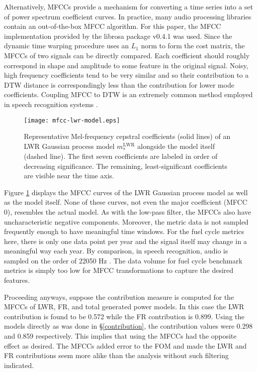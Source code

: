 \documentclass{ntmanuscript}
\newcommand{\LWR}{\mathrm{LWR}}
\begin{document}
Alternatively, MFCCs provide a mechanism for converting a time series into a
set of power spectrum coefficient curves. In practice, many audio processing
libraries contain an out-of-the-box MFCC algorithm. For this paper,
the MFCC implementation provided by the librosa package v0.4.1
\cite{mcfee2015librosa} was used.
Since the dynamic time warping procedure
uses an $L_1$ norm to form the cost matrix, the MFCCs of two signals can be directly
compared. Each coefficient should roughly correspond in shape and amplitude to some
feature in the original signal.  Noisy, high frequency coefficients tend to be
very similar and so their contribution to a DTW distance is correspondingly less
than the contribution for lower mode coefficients. Coupling MFCC to DTW is an
extremely common method employed in speech recognition systems
\cite{muda2010voice,milner2002speech,sato2007emotion}.

\begin{figure}[htb]
\centering
\texttt{[image: mfcc-lwr-model.eps]}
\caption{Representative Mel-frequency cepstral coefficients (solid lines) of
an LWR Gaussian process model $m_*^\LWR$ alongside the model itself (dashed
line). The first seven coefficients are labeled in order of decreasing
significance.  The remaining, least-significant coefficients are visible
near the time axis.}
\label{mfcc-lwr-model}
\end{figure}

Figure \ref{mfcc-lwr-model} displays the MFCC curves of the LWR Gaussian
process model as well as the model itself. None of these curves, not even the
major coefficient (MFCC 0), resembles the actual model.
As with the low-pass filter, the MFCCs also have
uncharacteristic negative components.  Moreover,
the metric data is not sampled frequently enough to have meaningful
time windows. For the fuel cycle metrics here, there is only one data point per year
and the signal itself may change in a meaningful way each year. By comparison,
in speech recognition, audio is sampled on the order of 22050 Hz
\cite{EBUTECH3285,juang1991hidden}.
The data volume for fuel cycle benchmark metrics
is simply too low for MFCC transformations to capture the desired features.

Proceeding anyways, suppose the contribution measure is computed for the MFCCs
of LWR, FR, and
total generated power models.  In this case the LWR contribution is found to be
0.572 while the FR contribution is 0.899. Using the models directly as was done
in \S\ref{contribution}, the contribution values were 0.298 and 0.859 respectively.
This implies that using the MFCCs had the opposite effect as desired.  The MFCCs
added error to the FOM and made the LWR and FR contributions seem more alike
than the analysis without such filtering indicated.
\end{document}
